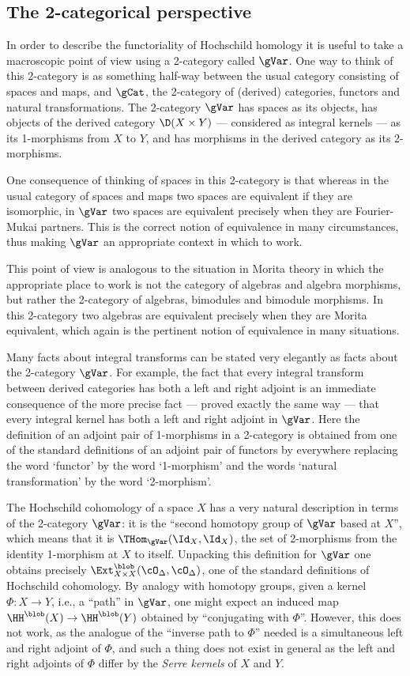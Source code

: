 \subsection*{The 2-categorical perspective}
In order to describe the functoriality of Hochschild homology it is
useful to take a macroscopic point of view using a 2-category called
$\gVar$.  One way to think of this 2-category is as something half-way
between the usual category consisting of spaces and maps, and $\gCat$,
the 2-category of (derived) categories, functors and natural
transformations.  The 2-category $\gVar$ has spaces as its objects,
has objects of the derived category $\D(X\times Y)$ --- considered as
integral kernels --- as its 1-morphisms from $X$ to $Y$, and has
morphisms in the derived category as its
2-morphisms.

One consequence of thinking of spaces in this 2-category is that
whereas in the usual category of spaces and maps two spaces are
equivalent if they are isomorphic, in $\gVar$ two spaces are
equivalent precisely when they are Fourier-Mukai partners.  This is
the correct notion of equivalence in many circumstances, thus making
$\gVar$ an appropriate context in which to work.

This point of view is analogous to the situation in Morita theory in
which the appropriate place to work is not the category of algebras
and algebra morphisms, but rather the 2-category of algebras,
bimodules and bimodule morphisms.  In this 2-category two algebras are
equivalent precisely when they are Morita equivalent, which again is
the pertinent notion of equivalence in many situations.

Many facts about integral transforms can be stated very elegantly as
facts about the 2-category $\gVar$.  For example, the fact that every
integral transform between derived categories has both a left and
right adjoint is an immediate consequence of the more precise fact ---
proved exactly the same way --- that every integral kernel has both a
left and right adjoint in $\gVar$.  Here the definition of an adjoint
pair of 1-morphisms in a 2-category is obtained from one of the
standard definitions of an adjoint pair of functors by everywhere replacing the
word `functor' by the word `1-morphism' and the words `natural
transformation' by the word `2-morphism'.

The Hochschild cohomology of a space $X$ has a very natural
description in terms of the 2-category $\gVar$: it is the ``second
homotopy group of $\gVar$ based at $X$'', which means that it is
$\THom_\gVar(\Id_X,\Id_X)$, the set of 2-morphisms from the identity
1-morphism at $X$ to itself.  Unpacking this definition for $\gVar$
one obtains precisely $\Ext^\blob_{X\times X}(\cO_\Delta,\cO_\Delta)$,
one of the standard definitions of Hochschild cohomology.  By analogy
with homotopy groups, given a kernel $\Phi\colon X\to Y$, i.e., a
``path'' in $\gVar$, one might expect an induced map $\HH^\blob(X)\to
\HH^\blob(Y)$ obtained by ``conjugating with $\Phi$''.  However, this
does not work, as the analogue of the ``inverse path to $\Phi$''
needed is a simultaneous left and right adjoint of $\Phi$, and such a
thing does not exist in general as the left and right adjoints of
$\Phi$ differ by the \emph{Serre kernels} of $X$ and $Y$.

